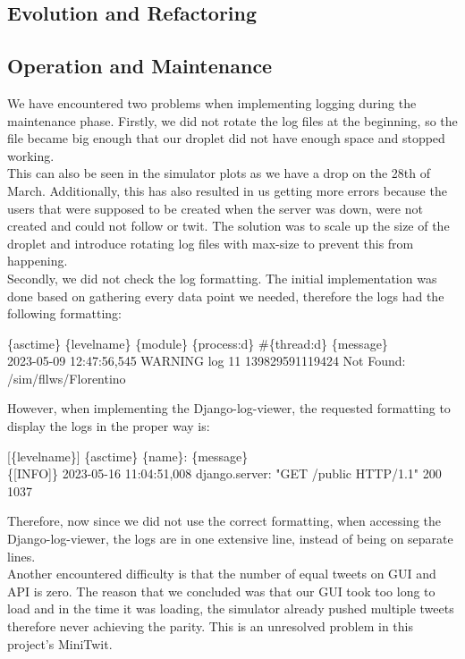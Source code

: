 \subsection{Evolution and Refactoring}



\subsection{Operation and Maintenance}

We have encountered two problems when implementing logging during the maintenance phase. Firstly, we did not rotate the log files at the beginning, so the file became big enough that our droplet did not have enough space and stopped working.\\
This can also be seen in the simulator plots as we have a drop on the 28th of March. Additionally, this has also resulted in us getting more errors because the users that were supposed to be created when the server was down, were not created and could not follow or twit. The solution was to scale up the size of the droplet and introduce rotating log files with max-size to prevent this from happening.\\
Secondly, we did not check the log formatting. The initial implementation was done based on gathering every data point we needed, therefore the logs had the following formatting:
\begin{center}
    \{asctime\} \{levelname\} \{module\} \{process:d\} \#\{thread:d\} \{message\}\\
    2023-05-09 12:47:56,545 WARNING log 11 139829591119424 Not Found: /sim/fllws/Florentino
\end{center}
However, when implementing the Django-log-viewer, the requested formatting to display the logs in the proper way is:
\begin{center}
    [\{levelname\}] \{asctime\} \{name\}: \{message\}\\
    \{[INFO]\} 2023-05-16 11:04:51,008 django.server: "GET /public HTTP/1.1" 200 1037
\end{center}
Therefore, now since we did not use the correct formatting, when accessing the Django-log-viewer, the logs are in one extensive line, instead of being on separate lines.\\
Another encountered difficulty is that the number of equal tweets on GUI and API is zero. The reason that we concluded was that our GUI took too long to load and in the time it was loading, the simulator already pushed multiple tweets therefore never achieving the parity. This is an unresolved problem in this project's MiniTwit.